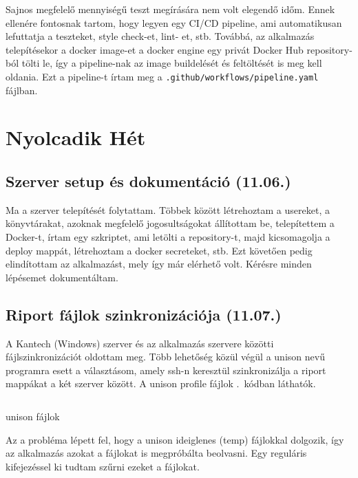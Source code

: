 \documentclass[a4paper]{article}
\newcommand{\inltxt}[1]{\texttt{#1}}
\begin{document}
Sajnos megfelelő mennyiségű teszt megírására nem volt elegendő időm. Ennek ellenére fontosnak
tartom, hogy legyen egy CI/CD pipeline, ami automatikusan lefuttatja a teszteket, style check-et, lint-
et, stb. Továbbá, az alkalmazás telepítésekor a docker image-et a docker engine egy privát Docker Hub
repository-ból tölti le, így a pipeline-nak az image buildelését és feltöltését is meg kell oldania. Ezt a
pipeline-t írtam meg a \inltxt{.github/workflows/pipeline.yaml} fájlban.

\section{Nyolcadik Hét}

\subsection{Szerver setup és dokumentáció (11.06.)}

Ma a szerver telepítését folytattam. Többek között létrehoztam a usereket, a könyvtárakat, azoknak
megfelelő jogosultságokat állítottam be, telepítettem a Docker-t, írtam egy szkriptet, ami letölti a
repository-t, majd kicsomagolja a deploy mappát, létrehoztam a docker secreteket, stb. Ezt követően
pedig elindítottam az alkalmazást, mely így már elérhető volt. Kérésre minden lépésemet
dokumentáltam.

\subsection{Riport fájlok szinkronizációja (11.07.)}

A Kantech (Windows) szerver és az alkalmazás szervere közötti fájlszinkronizációt oldottam meg. Több
lehetőség közül végül a unison nevű programra esett a választásom, amely ssh-n keresztül
szinkronizálja a riport mappákat a két szerver között. A unison profile fájlok
.~kódban láthatók.

\begin{listing}[!ht]
\inputminted[bgcolor=codebg, breaklines, breakanywhere, fontsize=\small]{text}{code/unison-files.prf}
\caption{unison fájlok}
\label{listing:unison_files}
\end{listing}

Az a probléma lépett fel, hogy a unison ideiglenes (temp) fájlokkal dolgozik, így az alkalmazás azokat
a fájlokat is megpróbálta beolvasni. Egy reguláris kifejezéssel ki tudtam szűrni ezeket a fájlokat.\\
\end{document}
